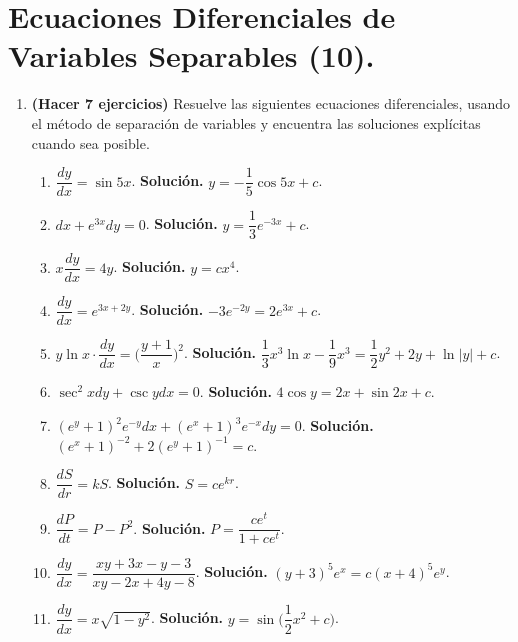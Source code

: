 \documentclass[letterpaper,10pt]{memoir}
\begin{document}
\section*{Ecuaciones Diferenciales de Variables Separables (10).} %
\begin{enumerate}
	\item \textbf{(Hacer 7 ejercicios)} Resuelve las siguientes ecuaciones diferenciales, usando el método de separación de variables y encuentra las soluciones explícitas cuando sea posible.\\[2mm]
		\begin{minipage}{0.5\linewidth}
			\begin{enumerate}
				\item \(\dfrac{dy}{dx} = \sin 5x\). \textbf{Solución.} \(y=- \dfrac{1}{5} \cos 5x+c\).
				\item \(dx+e^{3x} dy=0\). \textbf{Solución.} \(y= \dfrac{ 1}{3} e^{-3x} +c\).
				\item \(x \dfrac{dy}{dx} =4y\). \textbf{Solución.} \(y=cx^4\).
				\item \(\dfrac{dy}{dx} =e^{3x+2y}\). \textbf{Solución.} \(-3e^{-2y} =2e^{3x} +c\).
				\item \(y \ln x \cdot \dfrac{dy}{dx} = \Bigg(\dfrac{y+1}{x}\Bigg) ^2\). \textbf{Solución.} \(\dfrac{1}{3} x^3 \ln x- \dfrac{1}{9} x^3 = \dfrac{1}{2} y^2+2y+ \ln |y|+c\).
				\item \(\sec ^2x dy+ \csc ydx=0\). \textbf{Solución.} \(4 \cos y=2x+ \sin 2x+c\).
			\end{enumerate}
		\end{minipage}\hspace{5mm}
		\begin{minipage}{0.5\linewidth}
			\begin{enumerate}
			\setcounter{enumii}{6}
			\item \((e^y+1) ^2e^{-y} dx+(e^x+1) ^3e^{-x} dy=0\). \textbf{Solución.} \((e^x+1) ^{-2} +2(e^y+1) ^{-1} =c\).
			\item \(\dfrac{dS}{dr} =kS\). \textbf{Solución.} \(S=ce^{kr}\).
			\item \(\dfrac{dP}{dt} =P-P^2\). \textbf{Solución.} \(P= \dfrac{ce^t}{1+ce^t}\).
			\item \(\dfrac{dy}{dx} = \dfrac{xy+3x-y-3}{xy-2x+4y-8}\). \textbf{Solución.} \((y+3) ^5e^x=c(x+4) ^5e^y\).
			\item \(\dfrac{dy}{dx} =x \sqrt{1-y^2}\). \textbf{Solución.} \(y= \sin \Bigg(\dfrac{1}{2} x^2+c\Bigg)\).
			\end{enumerate}
		\end{minipage}

\end{enumerate}
\end{document}
